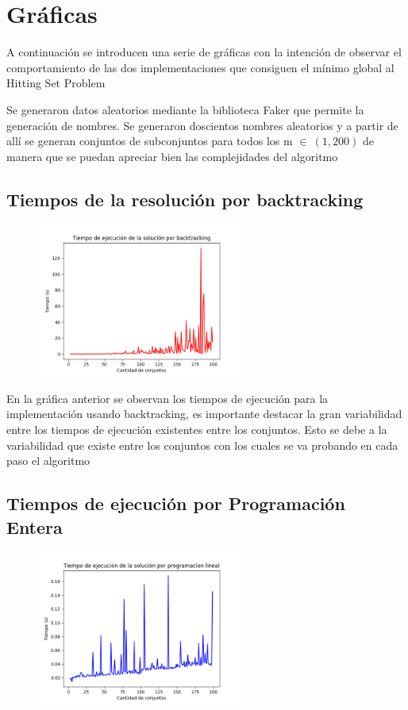 \section{Gráficas}

A continuación se introducen una serie de gráficas con la intención de observar el comportamiento de las dos implementaciones que consiguen el mínimo global al Hitting Set Problem

Se generaron datos aleatorios mediante la biblioteca Faker que permite la generación de nombres. Se generaron doscientos nombres aleatorios y a partir de allí se generan conjuntos de subconjuntos para todos los m $\in \ (1, 200)$ de manera que se puedan apreciar bien las complejidades del algoritmo 

\subsection{Tiempos de la resolución por backtracking }

\begin{figure}[H]
    \centering
    \includegraphics[width=0.6\textwidth]{graficos/backtracking.png}
\end{figure}

En la gráfica anterior se observan los tiempos de ejecución para la implementación usando backtracking, es importante destacar la gran variabilidad entre los tiempos de ejecución existentes entre los conjuntos. Esto se debe a la variabilidad que existe entre los conjuntos con los cuales se va probando en cada paso el algoritmo 

\subsection{Tiempos de ejecución por Programación Entera}

\begin{figure}[H]
    \centering
    \includegraphics[width=0.6\textwidth]{graficos/integerp.png}
\end{figure}

